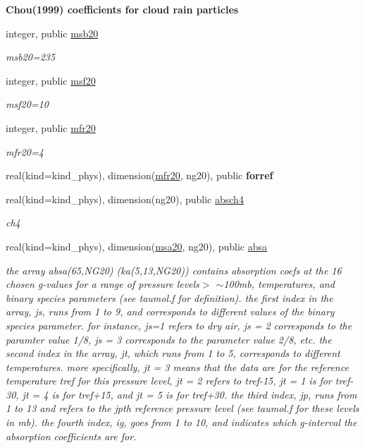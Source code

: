 \begin{Indent}\textbf{ Chou(1999) coefficients for cloud rain particles}\par
\begin{DoxyCompactItemize}
\item 
integer, public \hyperlink{group__module__radsw__kgbnn_ga385f5b8c61ed1de7aa3bbb6bd65f522f}{msb20}
\begin{DoxyCompactList}\small\item\em msb20=235 \end{DoxyCompactList}\item 
integer, public \hyperlink{group__module__radsw__kgbnn_ga925dc2da02eef4edcf000a14525a7c7e}{msf20}
\begin{DoxyCompactList}\small\item\em msf20=10 \end{DoxyCompactList}\item 
integer, public \hyperlink{group__module__radsw__kgbnn_ga9c7964eeb3acb4a11757fce977b73022}{mfr20}
\begin{DoxyCompactList}\small\item\em mfr20=4 \end{DoxyCompactList}\item 
real(kind=kind\+\_\+phys), dimension(\hyperlink{group__module__radsw__kgbnn_ga9c7964eeb3acb4a11757fce977b73022}{mfr20}, ng20), public {\bfseries forref}
\item 
real(kind=kind\+\_\+phys), dimension(ng20), public \hyperlink{group__module__radsw__kgbnn_ga1757aee0ec8211f84e2c9334cc9b0f9d}{absch4}
\begin{DoxyCompactList}\small\item\em ch4 \end{DoxyCompactList}\item 
real(kind=kind\+\_\+phys), dimension(\hyperlink{namespacemodule__radsw__kgb20_aadf199a3d453192a891b575d9adf8608}{msa20}, ng20), public \hyperlink{group__module__radsw__kgbnn_ga405eabf194b1216dd083c2344e80f5b4}{absa}
\begin{DoxyCompactList}\small\item\em the array absa(65,\+N\+G20) (ka(5,13,\+N\+G20)) contains absorption coefs at the 16 chosen g-\/values for a range of pressure levels$>$ $\sim$100mb, temperatures, and binary species parameters (see taumol.\+f for definition). the first index in the array, js, runs from 1 to 9, and corresponds to different values of the binary species parameter. for instance, js=1 refers to dry air, js = 2 corresponds to the paramter value 1/8, js = 3 corresponds to the parameter value 2/8, etc. the second index in the array, jt, which runs from 1 to 5, corresponds to different temperatures. more specifically, jt = 3 means that the data are for the reference temperature tref for this pressure level, jt = 2 refers to tref-\/15, jt = 1 is for tref-\/30, jt = 4 is for tref+15, and jt = 5 is for tref+30. the third index, jp, runs from 1 to 13 and refers to the jpth reference pressure level (see taumol.\+f for these levels in mb). the fourth index, ig, goes from 1 to 10, and indicates which g-\/interval the absorption coefficients are for. \end{DoxyCompactList}\item 

\end{DoxyCompactItemize}
\end{Indent}
